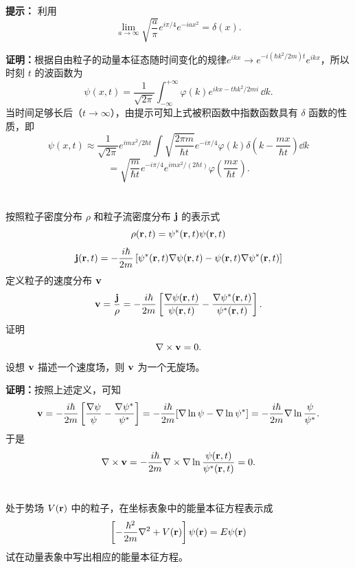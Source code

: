 \documentclass[10pt,a4paper]{article}
\begin{document}
\noindent\textbf{提示：}
利用
\[
\lim_{a\to\infty}\sqrt{\frac{a}{\pi}}e^{i\pi/4}e^{-iax^2}=\delta(x).
\]

\vspace{0.5cm}

\noindent\textbf{证明：}根据自由粒子的动量本征态随时间变化的规律$e^{ikx}\to e^{-i(\hbar k^2/2m)t}e^{ikx}$，所以时刻 $t$ 的波函数为
\[
\psi(x,t)=\frac{1}{\sqrt{2\pi}}\int_{-\infty}^{+\infty}\varphi(k)e^{ikx-t\hbar k^2/2mi}\, \dd k.
\]
当时间足够长后（$t\to\infty$），由提示可知上式被积函数中指数函数具有 $\delta$ 函数的性质，即
\[
\psi(x,t)\approx \frac{1}{\sqrt{2\pi}}e^{imx^2/2\hbar t}
\int \sqrt{\frac{2\pi m}{\hbar t}}e^{-i\pi/4}\varphi(k)
\delta\left(k-\frac{mx}{\hbar t}\right)\dd k
\]
\[
= \sqrt{\frac{m}{\hbar t}}e^{-i\pi/4}e^{imx^2/(2\hbar t)}
\varphi\left(\frac{mx}{\hbar t}\right).
\]

\section{}
按照粒子密度分布 $\rho$ 和粒子流密度分布 $\vb{j}$ 的表示式
\[
\rho(\vb{r},t)=\psi^*(\vb{r},t)\psi(\vb{r},t)
\]
\[
\vb{j}(\vb{r},t)=-\frac{i\hbar}{2m}\left[\psi^*(\vb{r},t)\nabla\psi(\vb{r},t)-\psi(\vb{r},t)\nabla\psi^*(\vb{r},t)\right]
\]
定义粒子的速度分布 $\vb{v}$
\[
\vb{v} = \frac{\vb{j}}{\rho}
= -\frac{i\hbar}{2m}\left[\frac{\nabla\psi(\vb{r},t)}{\psi(\vb{r},t)} - \frac{\nabla\psi^*(\vb{r},t)}{\psi^*(\vb{r},t)}\right].
\]
证明
\[
\nabla\times \vb{v} = 0.
\]
设想 $\vb{v}$ 描述一个速度场，则 $\vb{v}$ 为一个无旋场。

\vspace{0.5cm}

\noindent\textbf{证明：}按照上述定义，可知
\[
\vb{v}
= -\frac{i\hbar}{2m}\left[\frac{\nabla\psi}{\psi} - \frac{\nabla\psi^*}{\psi^*}\right]
= -\frac{i\hbar}{2m}[\nabla\ln\psi - \nabla\ln\psi^*]
= -\frac{i\hbar}{2m}\nabla\ln\frac{\psi}{\psi^*}.
\]
于是
\[
\nabla\times \vb{v}
= -\frac{i\hbar}{2m}\nabla\times\nabla\ln\frac{\psi(\vb{r},t)}{\psi^*(\vb{r},t)} = 0.
\]

\section{}
处于势场 $V(\vb{r})$ 中的粒子，在坐标表象中的能量本征方程表示成
\[
\left[-\frac{\hbar^2}{2m}\nabla^2 + V(\vb{r})\right]\psi(\vb{r})=E\psi(\vb{r})
\]
试在动量表象中写出相应的能量本征方程。

\vspace{0.5cm}
\end{document}
